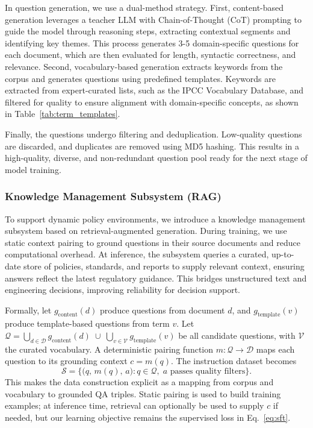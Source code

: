 \documentclass[]{interact}
\theoremstyle{plain}%
\theoremstyle{definition}
\theoremstyle{remark}
\begin{document}
In question generation, we use a dual-method strategy. First, content-based generation leverages a teacher LLM with Chain-of-Thought (CoT) prompting to guide the model through reasoning steps, extracting contextual segments and identifying key themes. This process generates 3-5 domain-specific questions for each document, which are then evaluated for length, syntactic correctness, and relevance. Second, vocabulary-based generation extracts keywords from the corpus and generates questions using predefined templates. Keywords are extracted from expert-curated lists, such as the IPCC Vocabulary Database, and filtered for quality to ensure alignment with domain-specific concepts, as shown in Table~\ref{tab:term_templates}.

Finally, the questions undergo filtering and deduplication. Low-quality questions are discarded, and duplicates are removed using MD5 hashing. This results in a high-quality, diverse, and non-redundant question pool ready for the next stage of model training.

\subsubsection{Knowledge Management Subsystem (RAG)}
To support dynamic policy environments, we introduce a knowledge management subsystem based on retrieval-augmented generation. During training, we use static context pairing to ground questions in their source documents and reduce computational overhead. At inference, the subsystem queries a curated, up-to-date store of policies, standards, and reports to supply relevant context, ensuring answers reflect the latest regulatory guidance. This bridges unstructured text and engineering decisions, improving reliability for decision support.

Formally, let \(g_{\mathrm{content}}(d)\) produce questions from document \(d\), and \(g_{\mathrm{template}}(v)\) produce template-based questions from term \(v\). Let \(\mathcal{Q} = \bigcup_{d\in\mathcal{D}} g_{\mathrm{content}}(d)\;\cup\;\bigcup_{v\in\mathcal{V}} g_{\mathrm{template}}(v)\) be all candidate questions, with \(\mathcal{V}\) the curated vocabulary. A deterministic pairing function \(m: \mathcal{Q} \to \mathcal{D}\) maps each question to its grounding context \(c=m(q)\). The instruction dataset becomes
\[\mathcal{S} = \big\{ \big(q,\, m(q),\, a\big) : q\in \mathcal{Q},\; a \text{ passes quality filters} \big\}.\]
This makes the data construction explicit as a mapping from corpus and vocabulary to grounded QA triples. Static pairing is used to build training examples; at inference time, retrieval can optionally be used to supply \(c\) if needed, but our learning objective remains the supervised loss in Eq.~\eqref{eq:sft}.
\end{document}

